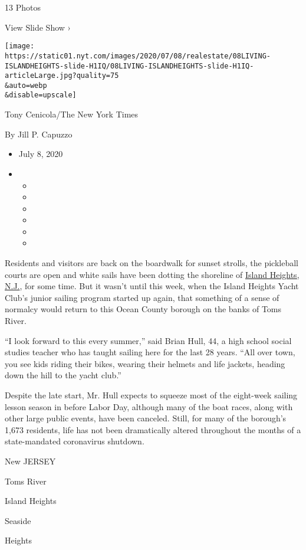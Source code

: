 13 Photos

View Slide Show ›

\texttt{[image: https://static01.nyt.com/images/2020/07/08/realestate/08LIVING-ISLANDHEIGHTS-slide-H1IQ/08LIVING-ISLANDHEIGHTS-slide-H1IQ-articleLarge.jpg?quality=75\\\&auto=webp\\\&disable=upscale]}

Tony Cenicola/The New York Times

By Jill P. Capuzzo

\begin{itemize}
\item
  July 8, 2020
\item
  \begin{itemize}
  \item
  \item
  \item
  \item
  \item
  \item
  \end{itemize}
\end{itemize}

Residents and visitors are back on the boardwalk for sunset strolls, the
pickleball courts are open and white sails have been dotting the
shoreline of \href{http://islandheightsboro.com/}{Island Heights, N.J.},
for some time. But it wasn't until this week, when the Island Heights
Yacht Club's junior sailing program started up again, that something of
a sense of normalcy would return to this Ocean County borough on the
banks of Toms River.

``I look forward to this every summer,'' said Brian Hull, 44, a high
school social studies teacher who has taught sailing here for the last
28 years. ``All over town, you see kids riding their bikes, wearing
their helmets and life jackets, heading down the hill to the yacht
club.''

Despite the late start, Mr. Hull expects to squeeze most of the
eight-week sailing lesson season in before Labor Day, although many of
the boat races, along with other large public events, have been
canceled. Still, for many of the borough's 1,673 residents, life has not
been dramatically altered throughout the months of a state-mandated
coronavirus shutdown.

New JERSEY

Toms River

Island Heights

Seaside

Heights

